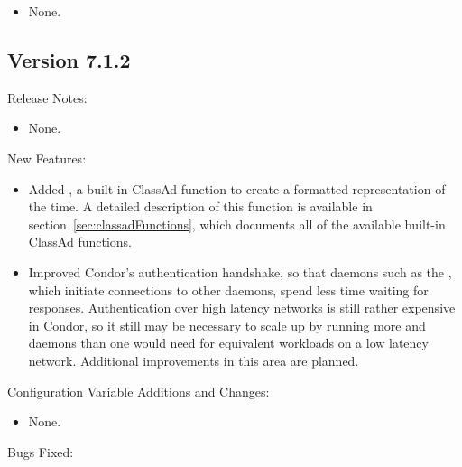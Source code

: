 \begin{itemize}

\item None.

\end{itemize}


\subsection*{\label{sec:New-7-1-2}Version 7.1.2}

\noindent Release Notes:

\begin{itemize}

\item None.

\end{itemize}


\noindent New Features:

\begin{itemize}

\item Added , a built-in ClassAd function to create a
  formatted representation of the time.  A detailed description of this
  function is available in section~\ref{sec:classadFunctions}, which
  documents all of the available built-in ClassAd functions.

\item Improved Condor's authentication handshake, so that daemons such
as the , which initiate connections to other daemons,
spend less time waiting for responses.
Authentication over high latency
networks is still rather expensive in Condor, so it still may be
necessary to scale up by running more  and 
daemons than one would need for equivalent workloads on a low latency network.
Additional improvements in this area are planned.

\end{itemize}

\noindent Configuration Variable Additions and Changes:

\begin{itemize}

\item None.

\end{itemize}

\noindent Bugs Fixed:

